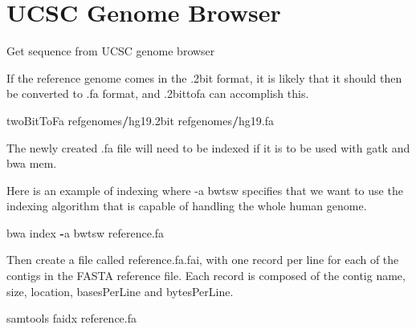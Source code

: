 \documentclass[]{book}
\newenvironment{Shaded}{\begin{snugshade}}{\end{snugshade}}
\newcommand{\SpecialCharTok}[1]{\textcolor[rgb]{0.00,0.00,0.00}{#1}}
\newcommand{\StringTok}[1]{\textcolor[rgb]{0.31,0.60,0.02}{#1}}
\newcommand{\ImportTok}[1]{#1}
\newcommand{\VariableTok}[1]{\textcolor[rgb]{0.00,0.00,0.00}{#1}}
\newcommand{\OperatorTok}[1]{\textcolor[rgb]{0.81,0.36,0.00}{\textbf{#1}}}
\newcommand{\NormalTok}[1]{#1}
\begin{document}
\section{UCSC Genome Browser}\label{ucsc-genome-browser}

Get sequence from UCSC genome browser

\begin{Shaded}
\end{Shaded}

If the reference genome comes in the .2bit format, it is likely that it
should then be converted to .fa format, and .2bittofa can accomplish
this.

\begin{Shaded}
\begin{Highlighting}[]
\NormalTok{twoBitToFa refgenomes}\OperatorTok{/}\NormalTok{hg19.2bit refgenomes}\OperatorTok{/}\NormalTok{hg19.fa}
\end{Highlighting}
\end{Shaded}

The newly created .fa file will need to be indexed if it is to be used
with gatk and bwa mem.

Here is an example of indexing where -a bwtsw specifies that we want to
use the indexing algorithm that is capable of handling the whole human
genome.

\begin{Shaded}
\begin{Highlighting}[]
\NormalTok{bwa index }\OperatorTok{-}\NormalTok{a bwtsw reference.fa}
\end{Highlighting}
\end{Shaded}

Then create a file called reference.fa.fai, with one record per line for
each of the contigs in the FASTA reference file. Each record is composed
of the contig name, size, location, basesPerLine and bytesPerLine.

\begin{Shaded}
\begin{Highlighting}[]
\NormalTok{samtools faidx reference.fa}
\end{Highlighting}
\end{Shaded}
\end{document}
